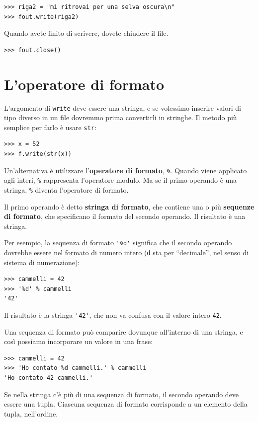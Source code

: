 \documentclass[10pt]{book}
\begin{document}
\begin{verbatim}
>>> riga2 = "mi ritrovai per una selva oscura\n"
>>> fout.write(riga2)
\end{verbatim}
%
Quando avete finito di scrivere, dovete chiudere il file.

\begin{verbatim}
>>> fout.close()
\end{verbatim}
%


\section{L'operatore di formato}

L'argomento di {\tt write} deve essere una stringa, e se volessimo inserire valori di tipo diverso in un file dovremmo prima convertirli in stringhe. Il metodo più semplice per farlo è usare {\tt str}:

\begin{verbatim}
>>> x = 52
>>> f.write(str(x))
\end{verbatim}
%
Un'alternativa è utilizzare l'{\bf operatore di formato}, {\tt \%}.  Quando viene applicato agli interi, {\tt \%} rappresenta l'operatore modulo.  Ma se il primo operando è una stringa, {\tt \%} diventa l'operatore di formato.

Il primo operando è detto {\bf stringa di formato}, che contiene una o più {\bf sequenze di formato}, che specificano il formato del secondo operando. Il risultato è una stringa.

Per esempio, la sequenza di formato \verb"'%d'" significa che il secondo operando dovrebbe essere nel formato di numero intero ({\tt d} sta per ``decimale'', nel senso di sistema di numerazione):

\begin{verbatim}
>>> cammelli = 42
>>> '%d' % cammelli
'42'
\end{verbatim}
%
Il risultato è la stringa \verb"'42'", che non va confusa con il valore intero {\tt 42}.

Una sequenza di formato può comparire dovunque all'interno di una
   stringa, e così possiamo incorporare un valore in una frase:

\begin{verbatim}
>>> cammelli = 42
>>> 'Ho contato %d cammelli.' % cammelli
'Ho contato 42 cammelli.'
\end{verbatim}
%
Se nella stringa c'è più di una sequenza di formato, il secondo operando deve essere una tupla. Ciascuna sequenza di formato corrisponde a un elemento della tupla, nell'ordine.
\end{document}
